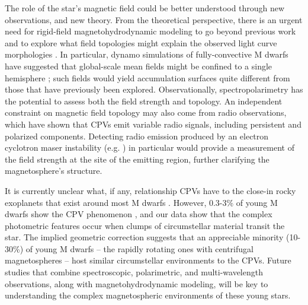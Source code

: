 \documentclass{nature3}
\begin{document}
The role of the star's magnetic field could be better understood
through new observations, and new theory.  From the theoretical
perspective, there is an urgent need for rigid-field
magnetohydrodynamic modeling to go beyond previous work
\cite{Townsend2005,Townsend2008,Krticka2022} and to explore what field
topologies might explain the observed light curve morphologies
\cite{Bouma2024}.  In particular, dynamo simulations of
fully-convective M dwarfs have suggested that global-scale mean fields
might be confined to a single hemisphere \cite{Brown2020}; such fields
would yield accumulation surfaces quite different from those that have
previously been explored.  Observationally, spectropolarimetry has the
potential to assess both the field strength and topology.  An
independent constraint on magnetic field topology may also come from
radio observations, which have shown \cite{Kaur2024} that CPVs emit
variable radio signals, including persistent and polarized components.
Detecting radio emission produced by an electron cyclotron maser
instability (e.g. \cite{Callingham2021}) in particular would provide
a measurement of the field strength at the site of the emitting
region, further clarifying the magnetosphere's structure.

It is currently unclear what, if any, relationship CPVs have to the
close-in rocky exoplanets that exist around most M dwarfs
\cite{Dressing2015}.  However, 0.3-3\% of young M dwarfs show the CPV
phenomenon \cite{Rebull2020}, and our data show that the complex
photometric features occur when clumps of circumstellar material
transit the star.  The implied geometric correction suggests that an
appreciable minority (10-30\%) of young M dwarfs -- the rapidly
rotating ones with centrifugal magnetospheres -- host similar
circumstellar environments to the CPVs.
Future studies that combine spectroscopic, polarimetric, and
multi-wavelength observations, along with magnetohydrodynamic
modeling, will be key to understanding the complex magnetospheric
environments of these young stars.



\end{document}
